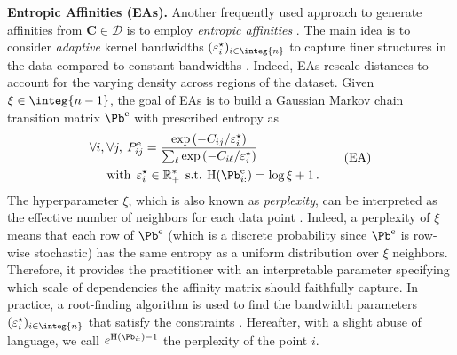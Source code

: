 \textbf{Entropic Affinities (EAs).} Another frequently used approach to generate affinities from $\mathbf{C} \in \mathcal{D}$ is to employ \emph{entropic affinities}  \cite{hinton2002stochastic}. The main idea is to consider \emph{adaptive} kernel bandwidths $(\varepsilon^\star_i)_{i \in \integ{n}}$ to capture finer structures in the data compared to constant bandwidths \cite{van2018recovering}. Indeed, EAs rescale distances to account for the varying density across regions of the dataset.
% 
Given $\xi \in \integ{n-1}$, the goal of EAs is to build a Gaussian Markov chain transition matrix $\Pb^{\mathrm{e}}$ with prescribed entropy as
\begin{equation}
\begin{split}
    \forall i, \: &\forall j, \: P^{\mathrm{e}}_{ij} = \frac{\exp{(-C_{ij}/\varepsilon^\star_i)}}{\sum_\ell \exp{(-C_{i\ell}/\varepsilon^\star_i)}} \\
    &\text{with} \:\: \varepsilon^\star_i \in \mathbb{R}^*_+ \:\: \text{s.t.} \: \operatorname{H}(\Pb^{\mathrm{e}}_{i:}) = \log{\xi} + 1\,. \label{eq:entropic_affinity_pb}
\end{split}\tag{EA}
\end{equation}
The hyperparameter $\xi$, which is also known as \emph{perplexity}, can be interpreted as the effective number of neighbors for each data point \cite{vladymyrov2013entropic}. Indeed, a perplexity of $\xi$ means that each row of $\Pb^{\mathrm{e}}$ (which is a discrete probability since $\Pb^{\mathrm{e}}$ is row-wise stochastic) has the same entropy as a uniform distribution over $\xi$ neighbors. Therefore, it provides the practitioner with an interpretable parameter specifying which scale of dependencies the affinity matrix should faithfully capture. In practice, a root-finding algorithm is used to find the bandwidth parameters $(\varepsilon_i^\star)_{i \in \integ{n}}$ that satisfy the constraints \cite{vladymyrov2013entropic}. Hereafter, with a slight abuse of language, we call $e^{\operatorname{H}(\Pb_{i:})-1}$ the perplexity of the point $i$.

